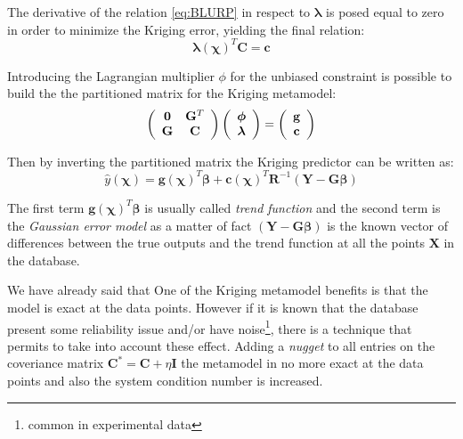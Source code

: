 The derivative of the relation \eqref{eq:BLURP} in respect to $\boldsymbol{ \lambda}$ is posed equal to zero in order to minimize the Kriging error, yielding the final relation:
\begin{equation}
\boldsymbol{\lambda}(\boldsymbol{\chi})^T \mathbf{C} = \mathbf{c}
\end{equation}

Introducing the Lagrangian multiplier $\phi$ for the unbiased constraint is possible to build the the partitioned matrix for the Kriging metamodel:
\begin{equation}
\left(
\begin{array}{c c}
\mathbf{0} & \mathbf{G}^T \\
\mathbf{G} & \mathbf{C}
\end{array}
\right)  \left( 
\begin{array}{c}
\boldsymbol{\phi} \\
\boldsymbol{\lambda}
\end{array}
\right) = \left( 
\begin{array}{c}
\mathbf{g} \\
\mathbf{c}
\end{array}
\right)
\end{equation}

Then by inverting the partitioned matrix the Kriging predictor can be written as:
\begin{equation}
\hat{y}(\boldsymbol{\chi}) = \mathbf{g}(\boldsymbol{\chi})^T \boldsymbol{\beta} + \mathbf{c}(\boldsymbol{\chi})^T \mathbf{R}^{-1} \left( \mathbf{Y} - \mathbf{G}\boldsymbol{\beta} \right)
\end{equation}

The first term $\mathbf{g}(\boldsymbol{\chi})^T \boldsymbol{\beta}$ is usually called \textit{trend function} and the second term is the \textit{Gaussian error model} as a matter of fact $\left( \mathbf{Y} - \mathbf{G}\boldsymbol{\beta} \right)$ is the known vector of differences between the true outputs and the trend function at all the points $\mathbf{X}$ in the database.

We have already said that One of the Kriging metamodel benefits is that the model is exact at the data points. However if it is known that the database present some reliability issue and/or have noise\footnote{common in experimental data}, there is a technique that permits to take into account these effect.
Adding a \textit{nugget} to all entries on the coveriance matrix $\mathbf{C}^* = \mathbf{C} + \eta \mathbf{I}$ the metamodel in no more exact at the data points and also the system condition number is increased.


